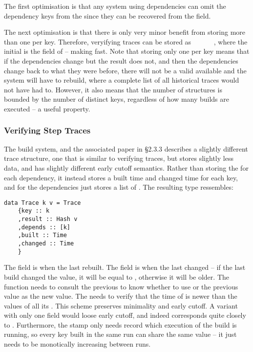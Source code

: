 The first optimisation is that any system using  dependencies can omit the dependency
keys from the  since they can be recovered from the  field.

The next optimisation is that there is only very minor benefit from storing more than one  per key. Therefore, veryifying traces can be stored as ~~~~~~, where the
initial  is the  field of  -- making  fast.
Note that storing only one  per key means that if the dependencies change but the result does not, and then the
dependencies change back to what they were before, there will not be a valid  available and the system will have to rebuild, where a complete list of all historical traces would not have had to. However, it also means that the number of  structures is bounded by the number of distinct keys, regardless of how many builds are executed -- a useful property.

\subsubsection{Verifying Step Traces}\label{sec-step-traces}

The \Shake build system, and the associated paper \cite{mitchell2012shake} in \S2.3.3 describes a slightly different trace structure, one that is similar to verifying traces, but stores slightly less data, and has slightly different early cutoff semantics. Rather than storing the  for each dependency, it instead stores a built time and changed time for each key, and for the dependencies just stores a list of . The resulting  type ressembles:

\begin{verbatim}
data Trace k v = Trace
    {key :: k
    ,result :: Hash v
    ,depends :: [k]
    ,built :: Time
    ,changed :: Time
    }
\end{verbatim}

The  field is when the  last rebuilt. The  field is when the  last changed -- if the last build changed the value, it will be equal to , otherwise it will be older. The  function needs to consult the previous  to know whether to use  or the previous  value as the new  value. The  needs to verify that the  time of  is newer than the  values of all its . This scheme preserves minimality and early cutoff. A variant with only one  field would loose early cutoff, and indeed corresponds quite closely to \Make. Furthermore, the  stamp only needs record which execution of the build is running, so every key built in the same run can share the same  value -- it just needs to be monotically increasing between runs.

